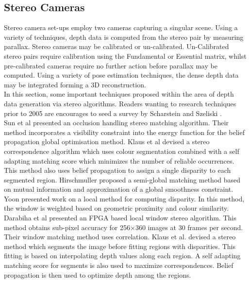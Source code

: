 \subsection{Stereo Cameras}

\label{StereoMethodsSection}

Stereo camera set-ups employ two cameras capturing a singular scene. Using a variety of techniques, depth data is computed from the stereo pair by measuring parallax. Stereo cameras may be calibrated or un-calibrated. Un-Calibrated stereo pairs require calibration using the Fundamental or Essential matrix, whilst pre-calibrated cameras require no further action before parallax may be computed. Using a variety of pose estimation techniques, the dense depth data may be integrated forming a 3D reconstruction. \\

In this section, some important techniques proposed within the area of depth data generation via stereo algorithms. Readers wanting to research techniques prior to 2005 are encourages to seed a survey by Scharstein and Szeliski \cite{Scharstein02Taxonomy}. \\


Sun et al \cite{Sun05Symmetric} presented an occlusion handling stereo matching algorithm. Their method incorporates a visibility constraint into the energy function for the belief propagation global optimisation method. Klaus et al \cite{Klaus06Segment} devised a stereo correspondence algorithm which uses colour segmentation combined with a self adapting matching score which minimizes the number of reliable occurrences. This method also uses belief propagation to assign a single disparity to each segmented region. Hirschmuller \cite{Hirschmuller05Accurate} proposed a semi-global matching method based on mutual information and approximation of a global smoothness constraint. \\

Yoon \cite{Yoon06Adaptive} presented work on a local method for computing disparity. In this method, the window is weighted based on geometric proximity and colour similarity. Darabiha et al \cite{Darabiha06Reconfigurable} presented an FPGA based local window stereo algorithm. This method obtains sub-pixel accuracy for 256$\times$360 images at 30 frames per second. Their window matching method uses correlation. Klaus et al. \cite{Klaus06Segment} devised a stereo method which segments the image before fitting regions with disparities. This fitting is based on interpolating depth values along each region. A self adapting matching score for segments is also used to maximize correspondences. Belief propagation is then used to optimize depth among the regions. \\


